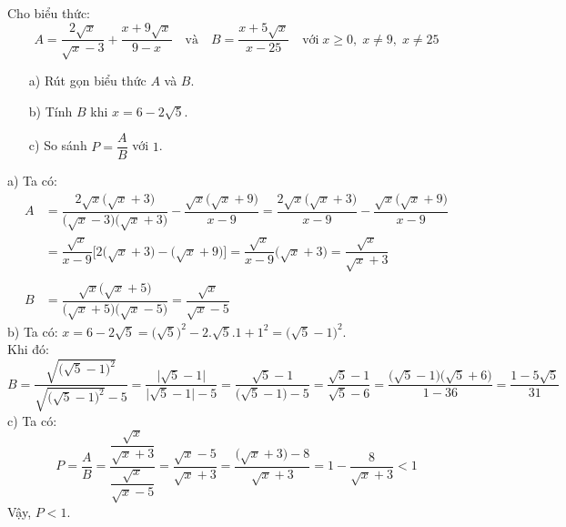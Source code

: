 \begin{ex}%
	Cho biểu thức:
	$$A=\dfrac{2\sqrt{x}}{\sqrt{x}-3}+\dfrac{x+9\sqrt{x}}{9-x} \quad \text{và}\quad B=\dfrac{x+5\sqrt{x}}{x-25} \quad \text{với}\; x\geq 0,\; x\neq 9,\; x\neq 25$$
	\begin{itemize}
	\item[a)] Rút gọn biểu thức $A$ và $B$.
	\item[b)] Tính $B$ khi $x=6-2\sqrt{5}$.
	\item[c)] So sánh $P=\dfrac{A}{B}$ với $1$.
	\end{itemize}
	\loigiai
	{
	a) Ta có:
	\begin{align*}
	A&=\dfrac{2\sqrt{x}\big(\sqrt{x}+3\big)}{\big(\sqrt{x}-3\big)\big(\sqrt{x}+3\big)}-\dfrac{\sqrt{x}\big(\sqrt{x}+9\big)}{x-9}=\dfrac{2\sqrt{x}\big(\sqrt{x}+3\big)}{x-9}-\dfrac{\sqrt{x}\big(\sqrt{x}+9\big)}{x-9}\\
	&=\dfrac{\sqrt{x}}{x-9}\bigg[ 2\big(\sqrt{x}+3\big)-\big(\sqrt{x}+9\big) \bigg]=\dfrac{\sqrt{x}}{x-9}\big(\sqrt{x}+3\big)=\dfrac{\sqrt{x}}{\sqrt{x}+3}\\
	& \\
	B&=\dfrac{\sqrt{x}\big(\sqrt{x}+5\big)}{\big(\sqrt{x}+5\big)\big(\sqrt{x}-5\big)}=\dfrac{\sqrt{x}}{\sqrt{x}-5}
	\end{align*}
	b) Ta có: $x=6-2\sqrt{5}=\big(\sqrt{5}\big)^2-2.\sqrt{5}.1+1^2=\big(\sqrt{5}-1\big)^2$.\\
	Khi đó:
	$$B=\dfrac{\sqrt{\big(\sqrt{5}-1\big)^2}}{\sqrt{\big(\sqrt{5}-1\big)^2}-5}=\dfrac{\big|\sqrt{5}-1\big|}{\big|\sqrt{5}-1\big|-5}=\dfrac{\sqrt{5}-1}{\big(\sqrt{5}-1\big)-5}=\dfrac{\sqrt{5}-1}{\sqrt{5}-6}=\dfrac{\big(\sqrt{5}-1\big)\big(\sqrt{5}+6\big)}{1-36}=\dfrac{1-5\sqrt{5}}{31}$$
	c) Ta có: 
	$$P=\dfrac{A}{B}=\dfrac{\dfrac{\sqrt{x}}{\sqrt{x}+3}}{\dfrac{\sqrt{x}}{\sqrt{x}-5}}=\dfrac{\sqrt{x}-5}{\sqrt{x}+3}=\dfrac{\big(\sqrt{x}+3\big)-8}{\sqrt{x}+3}=1-\dfrac{8}{\sqrt{x}+3}<1$$
	Vậy, $P<1$.
	}
\end{ex}
